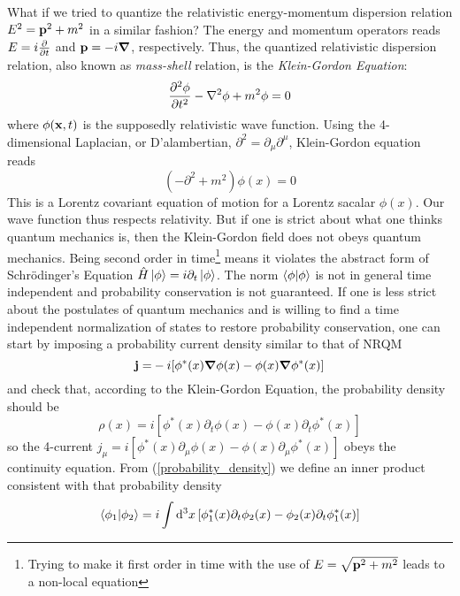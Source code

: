 What if we tried to quantize the relativistic energy-momentum dispersion relation $E^2=\vb{p}^2+m^2$ in a similar fashion? The energy  and momentum operators reads $E=i\pdv{t}$ and  $\vb{p}=-i\grad$, respectively. Thus, the quantized relativistic dispersion relation, also known as \textit{mass-shell} relation, is the \textit{Klein-Gordon Equation}:
\begin{equation}
    \pdv[2]{\phi}{t}-\laplacian{\phi}+m^2\phi=0
\end{equation}
where $\phi(\vb{x},t)$ is the supposedly relativistic wave function.  Using the 4-dimensional Laplacian, or D'alambertian, $\partial^2=\partial_\mu\partial^\mu$, Klein-Gordon equation reads
\begin{equation}
    (-\partial^2+m^2)\phi(x)=0
    \label{klein-gordon}
\end{equation}
  This is a Lorentz covariant equation of motion for a Lorentz sacalar $\phi(x)$. Our wave function thus respects relativity. But if one is strict about what one thinks quantum mechanics is, then the Klein-Gordon field does not obeys quantum mechanics. Being second order in time\footnote{Trying to make it first order in time with the use of $E=\sqrt{\vb{p}^2+m^2}$ leads to a non-local equation} means it violates the abstract form of Schrödinger's Equation $\hat{H}\ket{\phi}=i\partial_t\ket{\phi}$. The norm $\braket{\phi}{\phi}$ is not in general time independent and probability conservation is not guaranteed.  If one is less strict about the postulates of quantum mechanics and is willing to find a time independent normalization of states to restore probability conservation, one can start by imposing a probability current density similar to that of NRQM
\begin{equation}
    \vb{j=}-i[\phi^*(x)\grad\phi(x)-\phi(x)\grad\phi^*(x)]
    \label{probability_current}
\end{equation}
and check that, according to the Klein-Gordon Equation, the probability density should be
\begin{equation}
    \rho(x)=i[\phi^*(x)\partial_t\phi(x)-\phi(x)\partial_t\phi^*(x)]
    \label{probability_density}
\end{equation}
so the 4-current $j_\mu=i[\phi^*(x)\partial_\mu\phi(x)-\phi(x)\partial_\mu\phi^*(x)]$ obeys the continuity equation. From (\ref{probability_density}) we define an inner product consistent with that probability density
\begin{equation}
    \braket{\phi_1}{\phi_2}=i\int\dd^3x\,[\phi_1^*(x)\partial_t\phi_2(x)-\phi_2(x)\partial_t\phi_1^*(x)]
    \label{scalar_product}
\end{equation}

